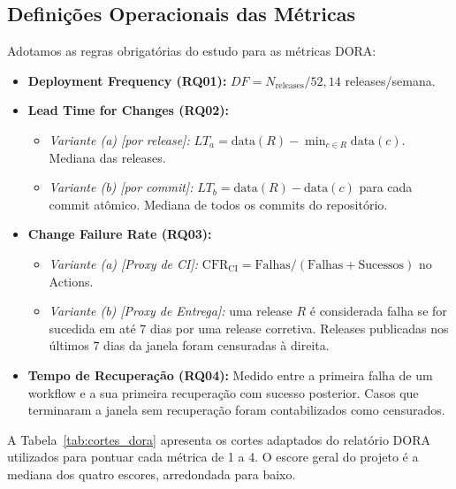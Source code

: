 \documentclass[12pt]{article}
\begin{document}
\subsection{Definições Operacionais das Métricas}
Adotamos as regras obrigatórias do estudo para as métricas DORA:
\begin{itemize}
    \item \textbf{Deployment Frequency (RQ01):} $DF = N_{\text{releases}} / 52{,}14$ releases/semana.
    \item \textbf{Lead Time for Changes (RQ02):}
    \begin{itemize}
        \item \textit{Variante (a) [por release]:} $LT_a = \text{data}(R) - \min_{c \in R} \text{data}(c)$. Mediana das releases.
        \item \textit{Variante (b) [por commit]:} $LT_b = \text{data}(R) - \text{data}(c)$ para cada commit atômico. Mediana de todos os commits do repositório.
    \end{itemize}
    \item \textbf{Change Failure Rate (RQ03):}
    \begin{itemize}
        \item \textit{Variante (a) [Proxy de CI]:} $\text{CFR}_{\text{CI}} = \text{Falhas} / (\text{Falhas} + \text{Sucessos})$ no Actions.
        \item \textit{Variante (b) [Proxy de Entrega]:} uma release $R$ é considerada falha se for sucedida em até 7 dias por uma release corretiva. Releases publicadas nos últimos 7 dias da janela foram censuradas à direita.
    \end{itemize}
    \item \textbf{Tempo de Recuperação (RQ04):} Medido entre a primeira falha de um workflow e a sua primeira recuperação com sucesso posterior. Casos que terminaram a janela sem recuperação foram contabilizados como censurados.
\end{itemize}

A Tabela~\ref{tab:cortes_dora} apresenta os cortes adaptados do relatório DORA utilizados para pontuar cada métrica de 1 a 4. O escore geral do projeto é a mediana dos quatro escores, arredondada para baixo.
\end{document}

